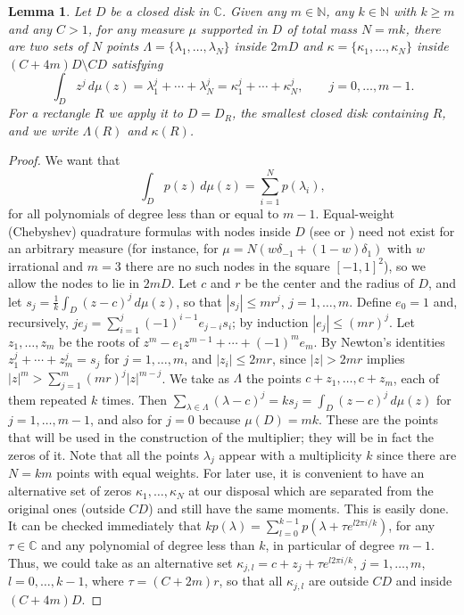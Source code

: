 \documentclass[12pt,twoside,final,psamsfonts]{amsart}
\theoremstyle{plain}
\newtheorem{lema}{Lemma}
\theoremstyle{remark}
\theoremstyle{definition}
\newcommand{\C}{{\mathbb C}}
\newcommand{\N}{{\mathbb N}}
\begin{document}
\begin{lema}\label{moments}
Let $D$ be a closed disk in $\C$.
Given any $m\in \N$, any $k\in\N$ with $k\ge m$ and any $C>1$,
for any measure $\mu$  supported in $D$ of  total mass $N=mk$, there are two  sets of $N$
points  $\Lambda=\{\lambda_1,\ldots,\lambda_N\}$ inside $2mD$
and $\kappa=\{\kappa_1,\ldots,\kappa_N\}$ inside $(C+4m)D\setminus CD$
satisfying
\[
\int_D z^j\, d\mu(z)=
\lambda_1^j+\cdots +\lambda_N^j=\kappa_1^j+\cdots+\kappa_N^j ,\qquad j=0,\ldots,m-1.
\]
For a rectangle $R$ we apply it to $D=D_R$, the smallest closed disk
containing $R$, and we write $\Lambda(R)$ and $\kappa(R)$.
\end{lema}


\begin{proof}
We want that
\[
\int_D p(z)\, d\mu(z)=\sum_{i=1}^N p(\lambda_i),
\]
for all polynomials of degree less than or equal to $m-1$.
Equal-weight (Chebyshev) quadrature formulas with nodes inside $D$ (see
\cite{Gautschi76} or \cite{Korevaar94}) need not exist for an arbitrary
measure (for instance, for $\mu=N(w\delta_{-1}+(1-w)\delta_1)$ with $w$
irrational and $m=3$ there are no such nodes in the square $[-1,1]^2$), so we
allow the nodes to lie in $2mD$. Let $c$ and $r$ be the center and the radius of
$D$, and let $s_j=\frac 1k\int_D (z-c)^j\,d\mu(z)$, so that $|s_j|\le m r^j$,
$j=1,\ldots,m$. Define $e_0=1$ and, recursively,
$je_j=\sum_{i=1}^{j}(-1)^{i-1}e_{j-i}s_i$; by induction $|e_j|\le (mr)^j$.
Let $z_1,\ldots,z_m$ be the roots of $z^m-e_1z^{m-1}+\cdots+(-1)^me_m$. By
Newton's identities $z_1^j+\cdots+z_m^j=s_j$ for $j=1,\ldots,m$, and
$|z_i|\le 2mr$, since $|z|>2mr$ implies
$|z|^m>\sum_{j=1}^m (mr)^j|z|^{m-j}$.
We take as $\Lambda$ the points $c+z_1,\ldots,c+z_m$, each of them repeated
$k$ times. Then $\sum_{\lambda\in\Lambda}(\lambda-c)^j=ks_j=\int_D (z-c)^j\,d\mu(z)$
for $j=1,\ldots,m-1$, and also for $j=0$ because $\mu(D)=mk$.
These are the points that will be used in the construction
of the multiplier; they will be in fact the zeros of it. Note that all the
points  $\lambda_j$ appear with a multiplicity $k$ since there are $N=km$
points with
equal weights. For later use, it is convenient to have an alternative set of
zeros $\kappa_1,\ldots,\kappa_N$  at our disposal which are separated from the original
ones (outside $CD$) and still have the same moments.
This is easily done. It can be checked immediately that
$kp(\lambda)=\sum_{l=0}^{k-1}p(\lambda+ \tau e^{l2\pi i/k})$, for any
$\tau\in
\C$ and any polynomial of degree less than $k$, in particular of degree
$m-1$. Thus, we could take as an alternative
set  $\kappa_{j,l}=c+z_j+\tau e^{l2\pi i/k}$, $j=1,\ldots,m$, $l=0,\ldots,k-1$,
where $\tau=(C+2m)r$, so that all $\kappa_{j,l}$ are outside $CD$ and inside $(C+4m)D$.
\end{proof}
\end{document}
